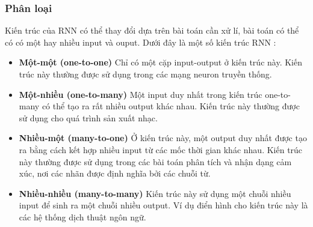 \subsubsection{Phân loại}
Kiến trúc của RNN có thể thay đổi dựa trên bài toán cần xử lí, bài toán có thể có có một hay nhiều input và ouput. Dưới đây là một số kiến trúc RNN \cite{webpage6}:
\begin{itemize}
    \item \textbf{Một-một (one-to-one)} Chỉ có một cặp input-output ở kiến trúc này. Kiến trúc này thường được sử dụng trong các mạng neuron truyền thống.
    \item \textbf{Một-nhiều (one-to-many)} Một input duy nhất trong kiến trúc one-to-many có thể tạo ra rất nhiều output khác nhau. Kiến trúc này thường được sử dụng cho quá trình sản xuất nhạc.
    \item \textbf{Nhiều-một (many-to-one)} Ở kiến trúc này, một output duy nhất được tạo ra bằng cách kết hợp nhiều input từ các mốc thời gian khác nhau. Kiến trúc này thường được sử dụng trong các bài toán phân tích và nhận dạng cảm xúc, nơi các nhãn được định nghĩa bởi các chuỗi từ.
    \item \textbf{Nhiều-nhiều (many-to-many)} Kiến trúc này sử dụng một chuỗi nhiều input để sinh ra một chuỗi nhiều output. Ví dụ điển hình cho kiến trúc này là các hệ thống dịch thuật ngôn ngữ.
\end{itemize}
